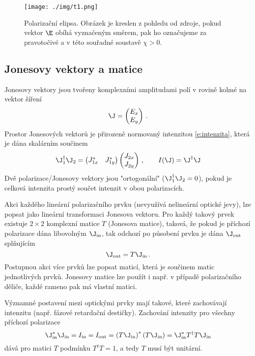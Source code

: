 \begin{figure}\centering
\texttt{[image: ./img/t1.png]}
\caption{Polarizační elipsa. Obrázek je kreslen z pohledu od zdroje, pokud vektor $\E$ obíhá vyznačeným směrem, pak ho označujeme za pravotočivé a v této souřadné soustavě $\chi>0$.}\label{f:pol_elipsa}
\end{figure}

\subsection{Jonesovy vektory a matice \cite{Jones}}
Jonesovy vektory jsou tvořeny komplexními amplitudami polí v rovině kolmé na vektor šíření
\begin{equation}
\J=\begin{pmatrix} E_{x} \\ E_{y} \end{pmatrix} \,.
\end{equation}
Prostor Jonesových vektorů je přirozeně normovaný intenzitou \eqref{e:intenzita}, která je dána skalárním součinem
\begin{equation}
\J_1^\dagger \J_2=
\begin{pmatrix}
J_{1x}^* & J_{1y}^*
\end{pmatrix}
\begin{pmatrix}
J_{2x} \\ J_{2y}
\end{pmatrix}
\,, \qquad I(\J)=\J^\dagger \J
\end{equation}
Dvě polarizace/Jonesovy vektory jsou "ortogonální" ($\J_1^\dagger \J_2=0$), pokud je celková intenzita prostý součet intenzit v obou polarizacích.

Akci každého lineární polarizačního prvku (nevyužívá nelineární optické jevy), lze popsat jako lineární transformaci Jonesova vektoru.
Pro každý takový prvek existuje $2\times 2$ komplexní matice $T$ (Jonesova matice), taková, že pokud je příchozí polarizace dána libovolným $\J_{\textrm{in}}$, tak odchozí po působení prvku je dána $\J_{\textrm{out}}$ splňujícím
\begin{equation}
\J_{\textrm{out}}=T \J_{\textrm{in}} \,.
\end{equation}
Postupnou akci více prvků lze popsat maticí, která je součinem matic jednotlivých prvků.
Jonesovy matice lze použít i např. v případě polarizačního děliče, každé rameno pak má vlastní matici.

Významné postavení mezi optickými prvky mají takové, které zachovávají intenzitu (např. fázové retardační destičky).
Zachování intenzity pro všechny příchozí polarizace
\begin{equation}
\J_{\textrm{in}}^*\J_{\textrm{in}}=I_{\textrm{in}}=I_{\textrm{out}}=\left(T \J_{\textrm{in}}\right)^* \left(T \J_{\textrm{in}}\right)=\J_{\textrm{in}}^* T^\dagger T \J_{\textrm{in}}
\end{equation}
dává pro matici $T$ podmínku $T^\dagger T=1$, a tedy $T$ musí být unitární.

